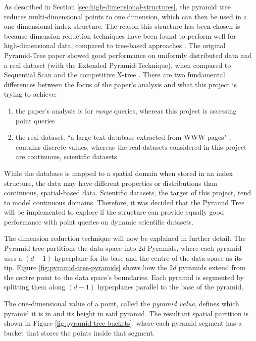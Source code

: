 As described in Section \ref{sec:high-dimensional-structures}, the pyramid tree reduces multi-dimensional points to one dimension, which can then be used in a one-dimensional index structure. The reason this structure has been chosen is because dimension reduction techniques have been found to perform well for high-dimensional data, compared to tree-based approaches \cite{md-structures-samet}. The original Pyramid-Tree paper showed good performance on uniformly distributed data and a real dataset (with the Extended Pyramid-Technique), when compared to Sequential Scan and the competitive X-tree \cite{pyramid-tree}. There are two fundamental differences between the focus of the paper's analysis and what this project is trying to achieve:
\begin{enumerate}
	\item the paper's analysis is for \textit{range} queries, whereas this project is assessing point queries
	\item the real dataset, ``a large text database extracted from WWW-pages" \cite{pyramid-tree}, contains discrete values, whereas the real datasets considered in this project are continuous, scientific datasets
\end{enumerate}
While the database is mapped to a spatial domain when stored in an index structure, the data may have different properties or distributions than continuous, spatial-based data. Scientific datasets, the target of this project, tend to model continuous domains. Therefore, it was decided that the Pyramid Tree will be implemented to explore if the structure can provide equally good performance with point queries on dynamic scientific datasets.

The dimension reduction technique will now be explained in further detail. The Pyramid tree partitions the data space into $2d$ Pyramids, where each pyramid uses a $(d - 1)$ hyperplane for its base and the centre of the data space as its tip. Figure \ref{fig:pyramid-tree-pyramids} shows how the $2d$ pyramids extend from the centre point to the data space's boundaries. Each pyramid is segmented by splitting them along $(d-1)$ hyperplanes parallel to the base of the pyramid.

The one-dimensional value of a point, called the \textit{pyramid value}, defines which pyramid it is in and its height in said pyramid. The resultant spatial partition is shown in Figure \ref{fig:pyramid-tree-buckets}, where each pyramid segment has a bucket that stores the points inside that segment.

